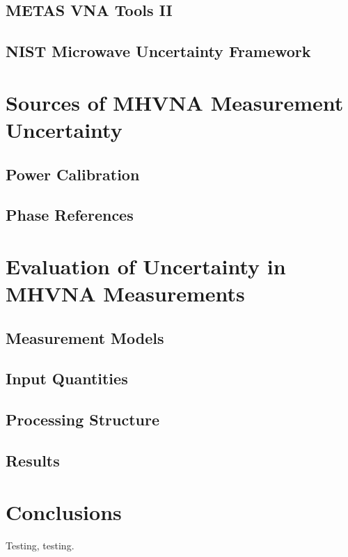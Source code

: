\documentclass[../thesis.tex]{subfiles}
\begin{document}
\begin{refsection}
\subsection{METAS VNA Tools II}
\subsection{NIST Microwave Uncertainty Framework}
\section{Sources of MHVNA Measurement Uncertainty}
\subsection{Power Calibration}
\subsection{Phase References}
\section{Evaluation of Uncertainty in MHVNA Measurements}
\subsection{Measurement Models}
\subsection{Input Quantities}
\subsection{Processing Structure}
\subsection{Results}
\section{Conclusions}
Testing, testing\cite{Stant_2016_Coll, Stant_2016}.
\printbibliography
\end{refsection}
\end{document}
